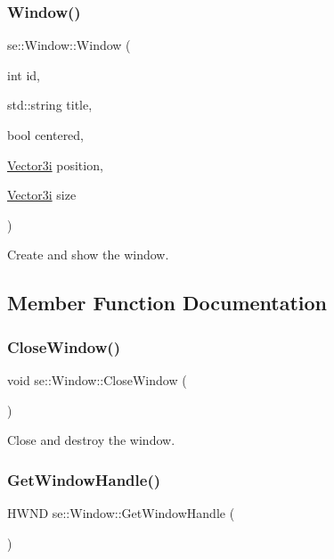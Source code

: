 \subsubsection{\texorpdfstring{Window()}{Window()}}
{\footnotesize\ttfamily se\+::\+Window\+::\+Window (\begin{DoxyParamCaption}\item[{int}]{id,  }\item[{std\+::string}]{title,  }\item[{bool}]{centered,  }\item[{\mbox{\hyperlink{namespacese_ada11715de7cf6e87b5dfb4611fe68d29}{Vector3i}}}]{position,  }\item[{\mbox{\hyperlink{namespacese_ada11715de7cf6e87b5dfb4611fe68d29}{Vector3i}}}]{size }\end{DoxyParamCaption})}

Create and show the window. 

\subsection{Member Function Documentation}
\mbox{\label{classse_1_1_window_a5d405fd0707124c8df9d4a628d7a33c7}} 
\subsubsection{\texorpdfstring{Close\+Window()}{CloseWindow()}}
{\footnotesize\ttfamily void se\+::\+Window\+::\+Close\+Window (\begin{DoxyParamCaption}{ }\end{DoxyParamCaption})}

Close and destroy the window. \mbox{\label{classse_1_1_window_afa8b06b9831c41d9a38e375bfb133c9e}} 
\subsubsection{\texorpdfstring{Get\+Window\+Handle()}{GetWindowHandle()}}
{\footnotesize\ttfamily H\+W\+ND se\+::\+Window\+::\+Get\+Window\+Handle (\begin{DoxyParamCaption}{ }\end{DoxyParamCaption})}

